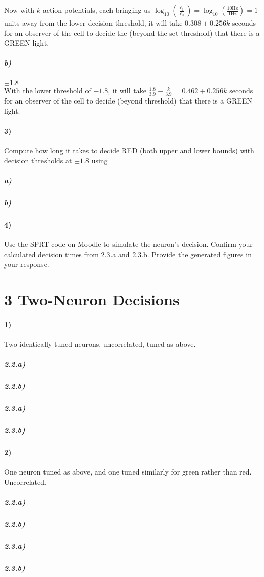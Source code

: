 \documentclass[10pt,letter]{article}
\begin{document}
Now with $k$ action potentials, each bringing us $\log_{10}(\frac{\ell_1}{\ell_0}) = \log_{10}(
\frac{10 \text{Hz}}{1 \text{Hz}}) = 1 $ units away from the lower decision threshold, 
it will take $0.308 + 0.256 k$ seconds 
for an observer of the cell to decide the (beyond the set threshold) that there is a GREEN light.\\

\subparagraph{b)} $\pm 1.8$\\

With the lower threshold of $-1.8$, it will take $\frac{1.8}{3.9} - \frac{k}{3.9} = 
0.462 + 0.256 k$ seconds 
for an observer of the cell to decide (beyond threshold) that there is a GREEN light.\\

\paragraph{3)} Compute how long it takes to decide RED (both upper and lower bounds) with decision
thresholds at $\pm 1.8$ using

\subparagraph{a)} 

\subparagraph{b)} 

\paragraph{4)} Use the SPRT code on Moodle to simulate the neuron’s decision. Confirm your calculated
decision times from 2.3.a and 2.3.b. Provide the generated figures in your
response.

\section*{3 Two-Neuron Decisions}

\paragraph{1)} Two identically tuned neurons, uncorrelated, tuned as above.

\subparagraph{2.2.a)} 

\subparagraph{2.2.b)} 

\subparagraph{2.3.a)} 

\subparagraph{2.3.b)} 

\paragraph{2)} One neuron tuned as above, and one tuned similarly for green rather than 
    red. Uncorrelated.

\subparagraph{2.2.a)} 

\subparagraph{2.2.b)} 

\subparagraph{2.3.a)} 

\subparagraph{2.3.b)} 
\end{document}
